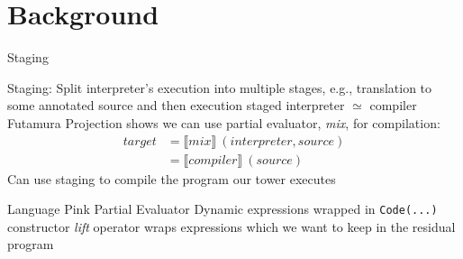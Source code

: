 \documentclass{beamer}
\begin{document}
\section{Background}
\begin{frame}{Staging}
    \begin{outline}
        \1 Staging: Split interpreter's execution into multiple stages, e.g., translation to some annotated source and then execution
        \pause
        \1 staged interpreter $\simeq$ compiler
        \pause
        \1  Futamura Projection \cite{futamura1999partial} shows we can use partial evaluator, \textit{mix}, for compilation:
                \begin{align*}
                    \mathit{target} & = \llbracket \mathit{mix} \rrbracket \: (\mathit{interpreter, source}) \\
                                    & = \llbracket \mathit{compiler} \rrbracket \: (\mathit{source})
                \end{align*}
         \1 Can use staging to compile the program our tower executes
    \end{outline}
\end{frame}

\begin{frame}{\texorpdfstring{\mslang}{}}
    \begin{outline}
        \1 Language Pink \cite{amin2017collapsing}
        \1 Partial Evaluator
        \1 Dynamic expressions wrapped in \texttt{Code(...)} constructor
        \1 \textit{lift} operator wraps expressions which we want to keep in the residual program
    \end{outline}
\end{frame}

%
%
\end{document}
